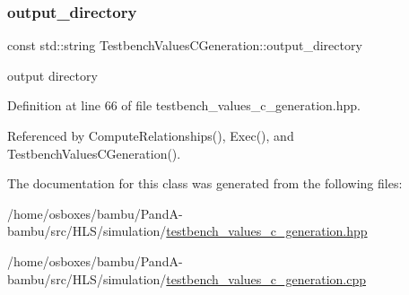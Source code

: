 \subsubsection{\texorpdfstring{output\+\_\+directory}{output\_directory}}
{\footnotesize\ttfamily const std\+::string Testbench\+Values\+C\+Generation\+::output\+\_\+directory\hspace{0.3cm}{\ttfamily [protected]}}



output directory 



Definition at line 66 of file testbench\+\_\+values\+\_\+c\+\_\+generation.\+hpp.



Referenced by Compute\+Relationships(), Exec(), and Testbench\+Values\+C\+Generation().



The documentation for this class was generated from the following files\+:\begin{DoxyCompactItemize}
\item 
/home/osboxes/bambu/\+Pand\+A-\/bambu/src/\+H\+L\+S/simulation/\hyperlink{testbench__values__c__generation_8hpp}{testbench\+\_\+values\+\_\+c\+\_\+generation.\+hpp}\item 
/home/osboxes/bambu/\+Pand\+A-\/bambu/src/\+H\+L\+S/simulation/\hyperlink{testbench__values__c__generation_8cpp}{testbench\+\_\+values\+\_\+c\+\_\+generation.\+cpp}\end{DoxyCompactItemize}
